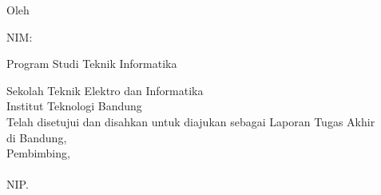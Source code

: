 \clearpage
\pagestyle{empty}

\begin{center}
\smallskip

    \Large \bfseries
    \judul
    \vfill

    \Large \context
    \vfill

    \large Oleh

    \Large \penulis

    \Large NIM: \nimpenulis

    \Large Program Studi Teknik Informatika

    \normalsize\normalfont
    Sekolah Teknik Elektro dan Informatika \\
    Institut Teknologi Bandung \\

    \vfill
    Telah disetujui dan disahkan untuk diajukan sebagai Laporan Tugas Akhir \\
    di Bandung, \tanggal\ \bulan\ \tahun
    \\[24pt]
    Pembimbing,
    \\[60pt]
    \underline{\pembimbing}\\
    NIP. \nippembimbing\\

\end{center}
\clearpage
